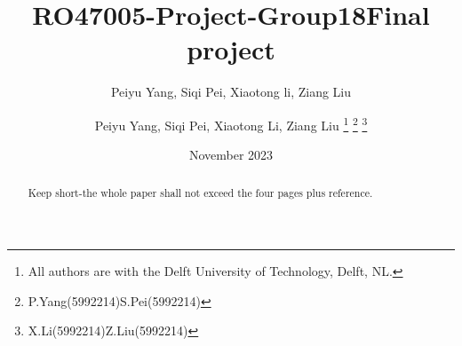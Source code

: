\documentclass{ieeeconf}
\title{RO47005-Project-Group18}
\author{Peiyu Yang, Siqi Pei, Xiaotong li, Ziang Liu }
\date{November 2023}
\title{Final project}
\author{Peiyu Yang, Siqi Pei, Xiaotong Li, Ziang Liu
\thanks{All authors are with the Delft University of Technology, Delft, NL. }
\thanks{P.Yang(5992214)S.Pei(5992214) }
\thanks{X.Li(5992214)Z.Liu(5992214) }
}
\begin{document}
\maketitle

\begin{abstract}
Keep short-the whole paper shall not exceed the four pages plus reference.
\end{abstract}








{
\normalem


}
\end{document}
